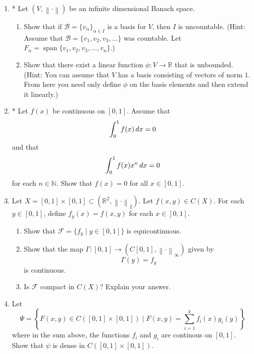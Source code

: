 \documentclass[notoc,notitlepage]{tufte-book}
\DeclareMathOperator{\Span}{span }
\newcommand{\norm}[1]{\left\| #1 \right\|}
\begin{document}
\begin{enumerate}
  \item * Let $(V, \norm\cdot)$ be an infinite dimensional Banach space.
    \begin{enumerate}
      \item Show that if $\mathcal{B} = \{ v_\alpha \}_{\alpha \in I}$ is a basis for $V$, then $I$ is uncountable. (Hint: Assume that $\mathcal{B} = \{ v_1, v_2, v_3, \ldots \}$ was countable. Let $F_n = \Span \{ v_1, v_2, v_3, \ldots, v_n \}$.)
      \item Show that there exist a linear function $\phi : V \to \mathbb{R}$ that is unbounded. (Hint: You can assume that $V$ has a basis consisting of vectors of norm $1$. From here you need only define $\phi$ on the basis elements and then extend it linearly.)
    \end{enumerate}

  \item * Let $f(x)$ be continuous on $[0, 1]$. Assume that
    \begin{equation*}
      \int_{0}^{1} f(x) \mathop{}\!d{x} = 0
    \end{equation*}
    and that
    \begin{equation*}
      \int_{0}^{1} f(x) x^n \mathop{}\!d{x} = 0
    \end{equation*}
    for each $n \in \mathbb{N}$. Show that $f(x) = 0$ for all $x \in [0, 1]$.

  \item Let $X = [0, 1] \times [0, 1] \subset ( \mathbb{R}^2, \norm\cdot_2 )$. Let $f(x, y) \in C(X)$. For each $y \in [0, 1]$, define $f_y(x) = f(x, y)$ for each $x \in [0, 1]$.
    \begin{enumerate}
      \item Show that $\mathcal{F} = \{ f_y \mid y \in [0, 1] \}$ is equicontinuous.
      \item Show that the map $\Gamma : [0, 1] \to (C[0, 1], \norm\cdot_\infty)$ given by
        \begin{equation*}
          \Gamma(y) = f_y
        \end{equation*}
        is continuous.
      \item Is $\mathcal{F}$ compact in $C(X)$? Explain your answer.
    \end{enumerate}

  \item Let
    \begin{equation*}
      \Psi = \left\{ F(x, y) \in C([0, 1] \times [0, 1]) \mid F(x, y) = \sum_{i=1}^{k} f_i(x) g_i(y) \right\}
    \end{equation*}
    where in the sum above, the functions $f_i$ and $g_i$ are continous on $[0, 1]$. Show that $\psi$ is dense in $C([0, 1] \times [0, 1])$.


\end{enumerate}
\end{document}
